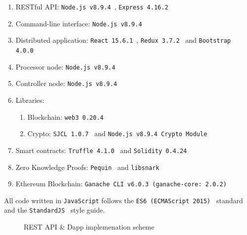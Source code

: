 \begin{enumerate}
  \item RESTful API: \verb|Node.js v8.9.4|~\cite{nodejs}, \verb|Express 4.16.2|~\cite{expressjs}
  \item Command-line interface: \verb|Node.js v8.9.4|
  \item Distributed application: \verb|React 15.6.1|~\cite{react}, \verb|Redux 3.7.2|~\cite{redux} and \verb|Bootstrap 4.0.0|~\cite{bootstrap}
  \item Processor node: \verb|Node.js v8.9.4|
  \item Controller node: \verb|Node.js v8.9.4|
  \item Libraries:
    \begin{enumerate}
      \item Blockchain: \verb|web3 0.20.4|~\cite{web3js}
      \item Crypto: \verb|SJCL 1.0.7|~\cite{sjcl} and \verb|Node.js v8.9.4 Crypto Module|
    \end{enumerate}
  \item Smart contracts: \verb|Truffle 4.1.0|~\cite{truffle} and \verb|Solidity 0.4.24|~\cite{solidity}
  \item Zero Knowledge Proofs: \verb|Pequin|~\cite{pequin} and \verb|libsnark|~\cite{libsnark}
  \item Ethereum Blockchain: \verb|Ganache CLI v6.0.3 (ganache-core: 2.0.2)|~\cite{ganache}
\end{enumerate}

All code written in \verb|JavaScript| follows the \verb|ES6 (ECMAScript 2015)|~\cite{ECMA_2015} standard and the  \verb|StandardJS|~\cite{stdjs} style guide.

\begin{figure}[ht!]
  \center
  \caption{REST API \& Dapp implemenation scheme}
  \label{fig:implemenation:rest}
\end{figure}

